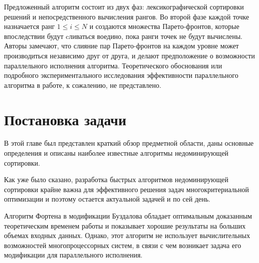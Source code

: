 Предложенный алгоритм состоит из двух фаз: лексикографической сортировки решений и непосредственного вычисления рангов.
Во второй фазе каждой точке назначается ранг $1\leq i \leq N$ и создаются множества Парето-фронтов, которые впоследствии будут cливаться воедино, пока ранги точек не будут вычислены.
Авторы замечают, что слияние пар Парето-фронтов на каждом уровне может производиться независимо друг от друга, и делают предположение о возможности параллельного исполнения алгоритма.
Теоретического обоснования или подробного экспериментального исследования эффективности параллельного алгоритма в работе, к сожалению, не представлено.

\section{Постановка задачи}
В этой главе был представлен краткий обзор предметной области, даны основные определения и описаны наиболее известные алгоритмы недоминирующей сортировки.

Как уже было сказано, разработка быстрых алгоритмов недоминирующей сортировки крайне важна для эффективного решения задач многокритериальной оптимизации и поэтому остается актуальной задачей и по сей день.

Алгоритм Фортена в модификации Буздалова обладает оптимальным доказанным теоретическим временем работы и показывает хорошие результаты на больших объемах входных данных.
Однако, этот алгоритм не использует вычислительных возможностей многопроцессорных систем, в связи с чем возникает задача его модификации для параллельного исполнения.

